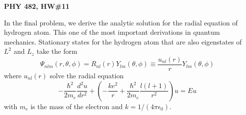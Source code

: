 \documentclass[11pt]{article}
\begin{document}
\thispagestyle{empty}

\centerline{\bf PHY 482, HW\#11}

%
\vspace*{1cm}
%
In the final problem, we derive the analytic solution for the radial equation of hydrogen atom. This one of the most important derivations in quantum mechanics. Stationary states for the hydrogen atom that are also eigenstates of $L^2$ and $L_z$ take the form
\begin{displaymath}
\Psi_{nlm}(r,\theta,\phi) = R_{nl}(r) Y_{lm}(\theta,\phi) \equiv \frac{u_{nl}(r)}{r} Y_{lm}(\theta,\phi)
\end{displaymath}
where $u_{nl}(r)$ solve the radial equation
\begin{equation}
-\frac{\hbar^2}{2m_e}\frac{d^2u}{dr^2} + \left(-\frac{ke^2}{r}+\frac{\hbar^2}{2m_e}\frac{l(l+1)}{r^2}\right)u = Eu
\end{equation}
with $m_e$ is the mass of the electron and $k=1/(4\pi\epsilon_0)$.
\end{document}
